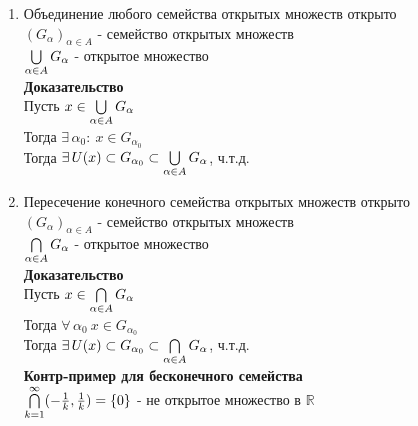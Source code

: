 \documentclass[12pt]{article}
\begin{document}
\begin{enumerate}
    \item Объединение любого семейства открытых множеств открыто\\
    $(G_\alpha)_{\alpha \in A}$ - семейство открытых множеств\\
    $\bigcup\limits_{\alpha \in A} G_\alpha$ - открытое множество\\
    \textbf{Доказательство}\\
    Пусть $x \in \bigcup\limits_{\alpha \in A} G_\alpha$\\
    Тогда $\exists\,\alpha_0:\ x\in G_{\alpha_0}$\\
    Тогда $\exists\,U(x) \subset G_{\alpha_0} \subset \bigcup\limits_{\alpha \in A} G_\alpha$, ч.т.д.
    \item Пересечение конечного семейства открытых множеств открыто\\
    $(G_\alpha)_{\alpha \in A}$ - семейство открытых множеств\\
    $\bigcap\limits_{\alpha \in A} G_\alpha$ - открытое множество\\
    \textbf{Доказательство}\\
    Пусть $x \in \bigcap\limits_{\alpha \in A} G_\alpha$\\
    Тогда $\forall\,\alpha_0\ x\in G_{\alpha_0}$\\
    Тогда $\exists\,U(x) \subset G_{\alpha_0} \subset \bigcap\limits_{\alpha \in A} G_\alpha$, ч.т.д.\\
    \textbf{Контр-пример для бесконечного семейства}\\
    $\bigcap\limits_{k=1}^\infty (-\frac 1k, \frac 1k) = \{0\}$ - не открытое множество в $\mathbb{R}$
\end{enumerate} 
\end{document}
